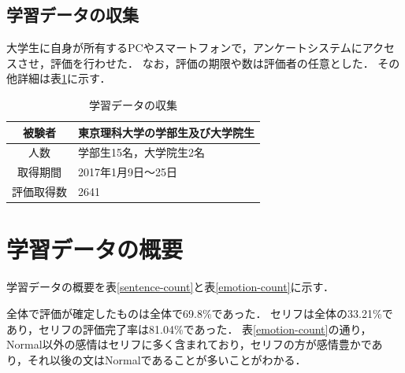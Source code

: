 \subsection{学習データの収集}
大学生に自身が所有するPCやスマートフォンで，アンケートシステムにアクセスさせ，評価を行わせた．
なお，評価の期限や数は評価者の任意とした．
その他詳細は表\ref{enviroment}に示す．

\begin{table}[ht]
  \begin{center}
  \caption{学習データの収集}
  \label{enviroment}
  \begin{tabular}{|c|l|}
    \hline
    被験者 & 東京理科大学の学部生及び大学院生 \\ \hline
    人数 & 学部生15名，大学院生2名 \\ \hline
    取得期間 & 2017年1月9日〜25日 \\ \hline
    評価取得数 & 2641 \\ \hline
  \end{tabular}
  \end{center}
\end{table}



\section{学習データの概要}
学習データの概要を表\ref{sentence-count}と表\ref{emotion-count}に示す．

全体で評価が確定したものは全体で69.8\%であった．
セリフは全体の33.21\%であり，セリフの評価完了率は81.04\%であった．
表\ref{emotion-count}の通り，Normal以外の感情はセリフに多く含まれており，セリフの方が感情豊かであり，それ以後の文はNormalであることが多いことがわかる．

\begin{table}[ht]
 \centering
  \caption{学習データ(物語別)}
  \vspace{0.3\baselineskip}
  \label{sentence-count}
\end{table}

